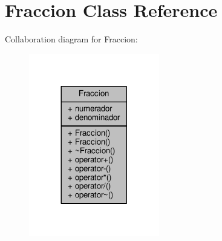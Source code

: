 \hypertarget{class_fraccion}{\section{Fraccion Class Reference}
\label{class_fraccion}
}


Collaboration diagram for Fraccion\+:
\nopagebreak
\begin{figure}[H]
\begin{center}
\leavevmode
\includegraphics[width=161pt]{class_fraccion__coll__graph}
\end{center}
\end{figure}
